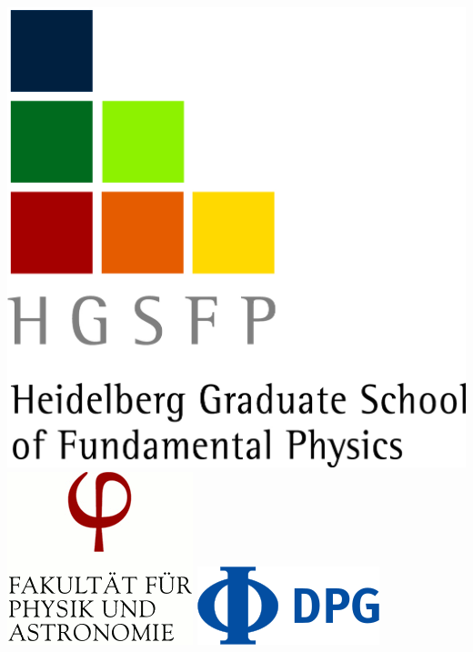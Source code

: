 \vspace{7mm}

\includegraphics[width=.35\textwidth]{media/hgsfp}
\hspace*{2mm}
\includegraphics[width=.35\textwidth]{media/physik}
\hfill
\includegraphics[width=.22\textwidth]{media/dpg}
